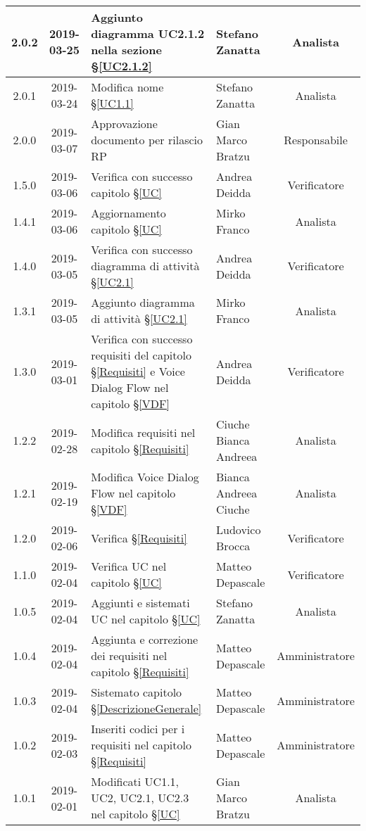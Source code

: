 \begin{center}
\begin{tabularx}{\textwidth}{|c|c|X|X|c|}
			\hline
			2.0.2 & 2019-03-25 & Aggiunto diagramma UC2.1.2 nella sezione \S\ref{UC2.1.2} & Stefano Zanatta & Analista \\
			\hline
			2.0.1 & 2019-03-24 & Modifica nome \S\ref{UC1.1} & Stefano Zanatta & Analista \\
			\hline
			2.0.0 & 2019-03-07 & Approvazione documento per rilascio RP & Gian Marco Bratzu & Responsabile \\
			\hline
			1.5.0 & 2019-03-06 & Verifica con successo capitolo \S\ref{UC} &Andrea Deidda & Verificatore \\
			\hline
			1.4.1 & 2019-03-06 & Aggiornamento capitolo \S\ref{UC} & Mirko Franco & Analista \\
			\hline
			1.4.0 & 2019-03-05 & Verifica con successo diagramma di attività \S\ref{UC2.1} & Andrea Deidda & Verificatore \\
			\hline
			1.3.1 & 2019-03-05 & Aggiunto diagramma di attività \S\ref{UC2.1} & Mirko Franco & Analista \\
			\hline
			1.3.0 & 2019-03-01 & Verifica con successo requisiti del capitolo \S\ref{Requisiti} e Voice Dialog Flow nel capitolo \S\ref{VDF} & Andrea Deidda & Verificatore \\
			\hline
			1.2.2 & 2019-02-28 & Modifica requisiti nel capitolo \S\ref{Requisiti}& Ciuche Bianca Andreea & Analista \\
			\hline
			1.2.1 & 2019-02-19 & Modifica Voice Dialog Flow  nel capitolo \S\ref{VDF} & Bianca Andreea Ciuche & Analista  \\
			\hline
			1.2.0 & 2019-02-06 & Verifica \S\ref{Requisiti}& Ludovico Brocca & Verificatore \\
			\hline
			1.1.0 & 2019-02-04 & Verifica UC nel capitolo \S\ref{UC}& Matteo Depascale & Verificatore\\
			\hline
			1.0.5 & 2019-02-04 & Aggiunti e sistemati UC nel capitolo \S\ref{UC}& Stefano Zanatta & Analista\\
			\hline
			1.0.4 & 2019-02-04 & Aggiunta e correzione dei requisiti nel capitolo \S\ref{Requisiti}& Matteo Depascale & Amministratore\\
			\hline
			1.0.3 & 2019-02-04 & Sistemato capitolo \S\ref{DescrizioneGenerale}& Matteo Depascale & Amministratore\\
			\hline
			1.0.2 & 2019-02-03 & Inseriti codici per i requisiti nel capitolo \S\ref{Requisiti}& Matteo Depascale & Amministratore\\
			\hline
			1.0.1 & 2019-02-01 & Modificati UC1.1, UC2, UC2.1, UC2.3 nel capitolo \S\ref{UC}& Gian Marco Bratzu & Analista\\

\end{tabularx}
\end{center}
